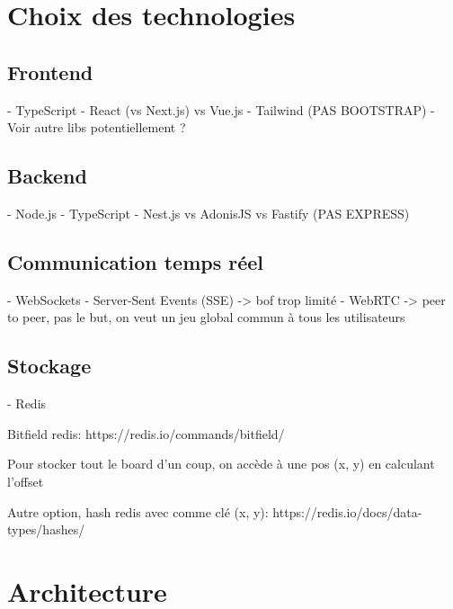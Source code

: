 \section{Choix des technologies}

\subsection{Frontend}

- TypeScript
- React (vs Next.js) vs Vue.js
- Tailwind (PAS BOOTSTRAP)
- Voir autre libs potentiellement ?

\subsection{Backend}

- Node.js
- TypeScript
- Nest.js vs AdonisJS vs Fastify (PAS EXPRESS)

\subsection{Communication temps réel}

- WebSockets
- Server-Sent Events (SSE) -> bof trop limité
- WebRTC -> peer to peer, pas le but, on veut un jeu global commun à tous les utilisateurs

\subsection{Stockage}

- Redis

Bitfield redis: https://redis.io/commands/bitfield/

Pour stocker tout le board d'un coup, on accède à une pos (x, y) en calculant l'offset

Autre option, hash redis avec comme clé (x, y): https://redis.io/docs/data-types/hashes/

\section{Architecture}